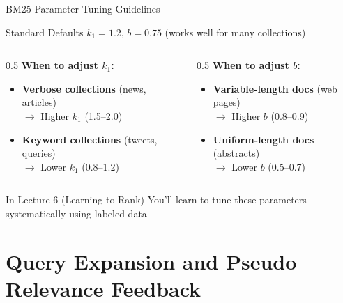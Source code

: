 \documentclass[aspectratio=169]{beamer}
\begin{document}
\begin{frame}{BM25 Parameter Tuning Guidelines}
\begin{block}{Standard Defaults}
$k_1 = 1.2$, $b = 0.75$ (works well for many collections)
\end{block}

\vspace{1em}

\begin{columns}
\begin{column}{0.5\textwidth}
\textbf{When to adjust $k_1$:}
\begin{itemize}
    \item \textbf{Verbose collections} (news, articles) \\
    $\rightarrow$ Higher $k_1$ (1.5--2.0)
    \item \textbf{Keyword collections} (tweets, queries) \\
    $\rightarrow$ Lower $k_1$ (0.8--1.2)
\end{itemize}
\end{column}

\begin{column}{0.5\textwidth}
\textbf{When to adjust $b$:}
\begin{itemize}
    \item \textbf{Variable-length docs} (web pages) \\
    $\rightarrow$ Higher $b$ (0.8--0.9)
    \item \textbf{Uniform-length docs} (abstracts) \\
    $\rightarrow$ Lower $b$ (0.5--0.7)
\end{itemize}
\end{column}
\end{columns}

\vspace{1em}

\begin{alertblock}{In Lecture 6 (Learning to Rank)}
You'll learn to tune these parameters systematically using labeled data
\end{alertblock}
\end{frame}

\section{Query Expansion and Pseudo Relevance Feedback}
\end{document}
